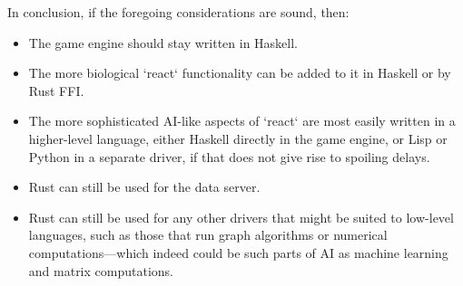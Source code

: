 In conclusion, if the foregoing considerations are sound, then:
\begin{itemize}
    \item The game engine should stay written in Haskell.
    \item The more biological `react` functionality can be added to it in
    Haskell or by Rust FFI\@.
    \item The more sophisticated AI-like aspects of `react` are most easily
    written in a higher-level language, either Haskell directly in the game
    engine, or Lisp or Python in a separate driver, if that does not
    give rise to spoiling delays.
    \item Rust can still be used for the data server.
    \item Rust can still be used for any other drivers that might be
    suited to low-level languages, such as those that run graph algorithms or
    numerical computations---which indeed could be such parts of AI as machine
    learning and matrix computations.
\end{itemize}
